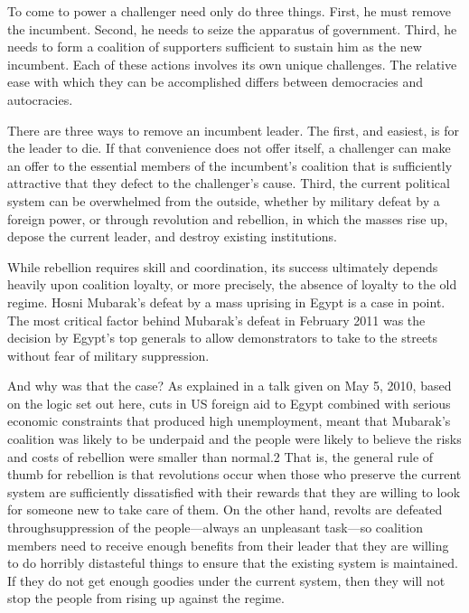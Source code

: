 \documentclass[10pt]{article}
\begin{document}
{\large To come to power a challenger need only do three things. First, he must
remove the incumbent. Second, he needs to seize the apparatus of government.
Third, he needs to form a coalition of supporters sufficient to sustain him as
the new incumbent. Each of these actions involves its own unique challenges. The
relative ease with which they can be accomplished differs between democracies and
autocracies.}

{\large There are three ways to remove an incumbent leader. The first, and
easiest, is for the leader to die. If that convenience does not offer itself, a
challenger can make an offer to the essential members of the incumbent's
coalition that is sufficiently attractive that they defect to the challenger's
cause. Third, the current political system can be overwhelmed from the outside,
whether by military defeat by a foreign power, or through revolution and
rebellion, in which the masses rise up, depose the current leader, and destroy
existing institutions.}

{\large While rebellion requires skill and coordination, its success ultimately
depends heavily upon coalition loyalty, or more precisely, the absence of loyalty
to the old regime. Hosni Mubarak's defeat by a mass uprising in Egypt is a case
in point. The most critical factor behind Mubarak's defeat in February 2011 was
the decision by Egypt's top generals to allow demonstrators to take to the
streets without fear of military suppression.}

{\large And why was that the case? As explained in a talk given on May 5, 2010,
based on the logic set out here, cuts in US foreign aid to Egypt combined with
serious economic constraints that produced high unemployment, meant that
Mubarak's coalition was likely to be underpaid and the people were likely to
believe the risks and costs of rebellion were smaller than normal.2 That is, the
general rule of thumb for rebellion is that revolutions occur when those who
preserve the current system are sufficiently dissatisfied with their rewards that
they are willing to look for someone new to take care of them. On the other hand,
revolts are defeated throughsuppression of the people---always an unpleasant
task---so coalition members need to receive enough benefits from their leader
that they are willing to do horribly distasteful things to ensure that the
existing system is maintained. If they do not get enough goodies under the
current system, then they will not stop the people from rising up against the
regime.}
\end{document}
